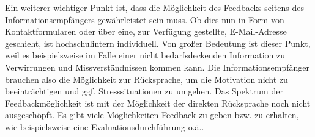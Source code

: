 Ein weiterer wichtiger Punkt ist, dass die Möglichkeit des Feedbacks seitens des Informationsempfängers gewährleistet sein muss. 
Ob dies nun in Form von Kontaktformularen oder über eine, zur Verfügung gestellte, E-Mail-Adresse geschieht, ist hochschulintern individuell. 
Von großer Bedeutung ist dieser Punkt, weil es beispielsweise im Falle einer nicht bedarfsdeckenden Information zu Verwirrungen und Missverständnissen kommen kann. 
Die Informationsempfänger brauchen also die Möglichkeit zur Rücksprache, um die Motivation nicht zu beeinträchtigen und ggf. Stresssituationen zu umgehen. 
Das Spektrum der Feedbackmöglichkeit ist mit der Möglichkeit der direkten Rücksprache noch nicht ausgeschöpft. 
Es gibt viele Möglichkeiten Feedback zu geben bzw. zu erhalten, wie beispielsweise eine Evaluationsdurchführung o.ä..
